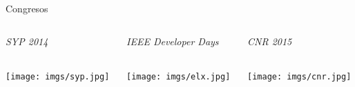 \begin{frame}{Congresos}    
    \begin{columns}\begin{column}{0.33\textwidth}
        \centering\large\textit{SYP 2014}  \\~
        
        \texttt{[image: imgs/syp.jpg]}
    \end{column}\begin{column}{0.33\textwidth}
        \centering\large\textit{IEEE Developer Days} \\~
        
        \texttt{[image: imgs/elx.jpg]}
    \end{column}\begin{column}{0.33\textwidth}
        \centering\large\textit{CNR 2015}  \\~
        
        \texttt{[image: imgs/cnr.jpg]}
    \end{column}\end{columns}
\end{frame}